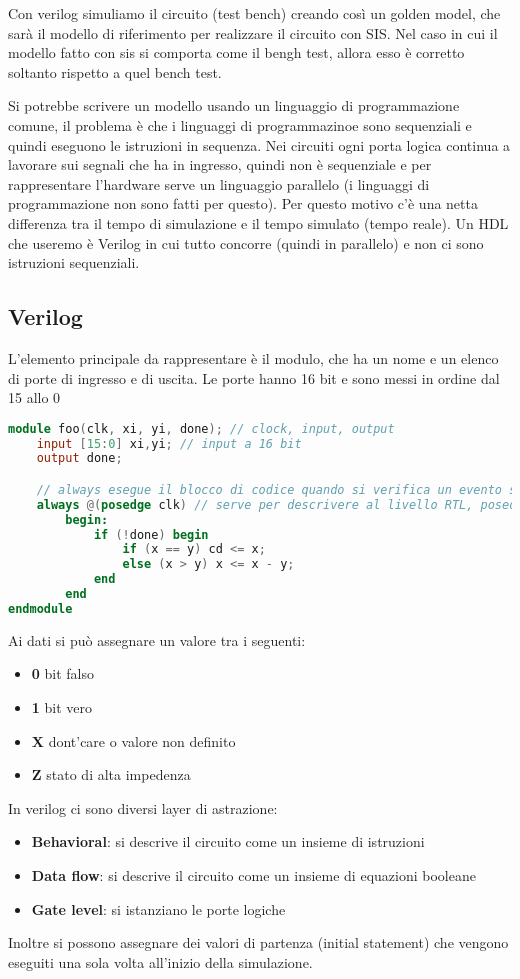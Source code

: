 \documentclass[a4paper]{article}
\theoremstyle{break}
\theoremstyle{break}
\theoremstyle{break}
\theoremstyle{break}
\begin{document}
Con verilog simuliamo il circuito (test bench) creando così un golden model, che sarà il
modello di riferimento per realizzare il circuito con SIS. Nel caso in cui il modello fatto con sis
si comporta come il bengh test, allora esso è corretto soltanto rispetto a quel bench test.

Si potrebbe scrivere un modello usando un linguaggio di programmazione comune, il problema è che 
i linguaggi di programmazinoe sono sequenziali e quindi eseguono le istruzioni in sequenza.
Nei circuiti ogni porta logica continua a lavorare sui segnali che ha in ingresso, quindi
non è sequenziale e per rappresentare l'hardware serve un linguaggio parallelo (i linguaggi di 
programmazione non sono fatti per questo). Per questo motivo c'è una netta differenza tra il tempo
di simulazione e il tempo simulato (tempo reale). Un HDL che useremo è Verilog in cui tutto concorre
(quindi in parallelo) e non ci sono istruzioni sequenziali.
\subsection{Verilog}
L'elemento principale da rappresentare è il modulo, che ha un nome e un elenco di porte di ingresso
e di uscita. Le porte hanno 16 bit e sono messi in ordine dal 15 allo 0
\begin{lstlisting}[language=Verilog]
module foo(clk, xi, yi, done); // clock, input, output
    input [15:0] xi,yi; // input a 16 bit
    output done;

    // always esegue il blocco di codice quando si verifica un evento sull'argomento
    always @(posedge clk) // serve per descrivere al livello RTL, posedge verifica quando il clock passa da 0 a 1
        begin:
            if (!done) begin
                if (x == y) cd <= x;
                else (x > y) x <= x - y;
            end
        end
endmodule
\end{lstlisting}
Ai dati si può assegnare un valore tra i seguenti:
\begin{itemize}
    \item \textbf{0} bit falso
    \item \textbf{1} bit vero
    \item \textbf{X} dont'care o valore non definito
    \item \textbf{Z} stato di alta impedenza 
\end{itemize}
In verilog ci sono diversi layer di astrazione:
\begin{itemize}
    \item \textbf{Behavioral}: si descrive il circuito come un insieme di istruzioni
    \item \textbf{Data flow}: si descrive il circuito come un insieme di equazioni booleane
    \item \textbf{Gate level}: si istanziano le porte logiche
\end{itemize}
Inoltre si possono assegnare dei valori di partenza (initial statement) che vengono eseguiti
una sola volta all'inizio della simulazione.
\end{document}
